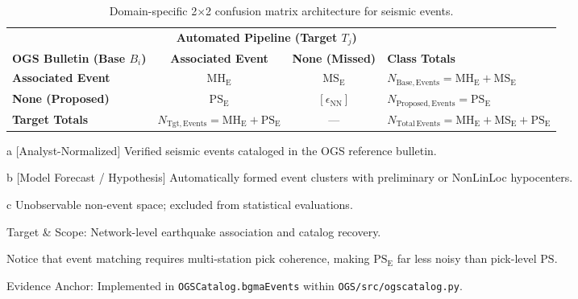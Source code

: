 \begin{table}[htbp]
  \centering
  \small
  \caption{Domain-specific 2$\times$2 confusion matrix architecture for seismic events.}
  \label{tab:event_confusion_matrix}
  \begin{threeparttable}
    \begin{tabularx}{\linewidth}{l c c X}
      \toprule
      & \multicolumn{2}{c}{\textbf{Automated Pipeline (Target $T_j$)}} & \\
      \cmidrule(lr){2-3}
      \textbf{OGS Bulletin (Base $B_i$)\tnote{a}} & \textbf{Associated Event} & \textbf{None (Missed)} & \textbf{Class Totals} \\
      \midrule
      \textbf{Associated Event} & $\mathrm{MH}_{\mathrm{E}}$ & $\mathrm{MS}_{\mathrm{E}}$ & $N_{\mathrm{Base}, \mathrm{Events}} = \mathrm{MH}_{\mathrm{E}} + \mathrm{MS}_{\mathrm{E}}$ \\
      \textbf{None (Proposed)\tnote{b}} & $\mathrm{PS}_{\mathrm{E}}$ & $[\epsilon_{\mathrm{NN}}]$\tnote{c} & $N_{\mathrm{Proposed}, \mathrm{Events}} = \mathrm{PS}_{\mathrm{E}}$ \\
      \midrule
      \textbf{Target Totals} & $N_{\mathrm{Tgt}, \mathrm{Events}} = \mathrm{MH}_{\mathrm{E}} + \mathrm{PS}_{\mathrm{E}}$ & --- & $N_{\mathrm{Total\,Events}} = \mathrm{MH}_{\mathrm{E}} + \mathrm{MS}_{\mathrm{E}} + \mathrm{PS}_{\mathrm{E}}$ \\
      \bottomrule
    \end{tabularx}
    \begin{tablenotes}[flushleft]
      \footnotesize
      \item[a] [Analyst-Normalized] Verified seismic events cataloged in the OGS reference bulletin.
      \item[b] [Model Forecast / Hypothesis] Automatically formed event clusters with preliminary or NonLinLoc hypocenters.
      \item[c] Unobservable non-event space; excluded from statistical evaluations.
      \item Target \& Scope: Network-level earthquake association and catalog recovery.
      \item Notice that event matching requires multi-station pick coherence, making $\mathrm{PS}_{\mathrm{E}}$ far less noisy than pick-level $\mathrm{PS}$.
      \item Evidence Anchor: Implemented in \texttt{OGSCatalog.bgmaEvents} within \texttt{OGS/src/ogscatalog.py}.
    \end{tablenotes}
  \end{threeparttable}
\end{table}

